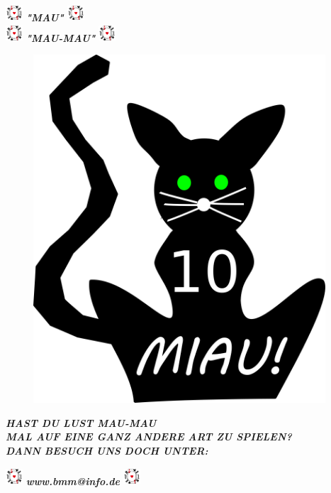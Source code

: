 \documentclass{article}
\begin{document}
\begin{center}
\includegraphics[width=24px, height=24px]{photos/logo.png}
\huge{\textit{\textbf{"MAU"}}}
\includegraphics[width=24px, height=24px]{photos/logo.png}
 \\ \includegraphics[width=24px, height=24px]{photos/logo.png}
\huge{\textit{\textbf{"MAU-MAU"}}} \includegraphics[width=24px, height=24px]{photos/logo.png} 

\end{center}
\begin{center}
\includegraphics[width=490px, height=490px]{photos/cat.png}
\end{center}
\huge{\textit{\textbf{HAST DU LUST MAU-MAU}}} \\
\huge{\textit{\textbf{MAL AUF EINE GANZ ANDERE ART ZU SPIELEN?}}} \\
\huge{\textit{\textbf{DANN BESUCH UNS DOCH UNTER:}}} \\
\begin{center}
\includegraphics[width=24px, height=24px]{photos/logo.png}
\huge{\textit{\textbf{www.bmm@info.de}}}
\includegraphics[width=24px, height=24px]{photos/logo.png}
\end{center}




 \BgThispage
 \clearpage
\end{document}

